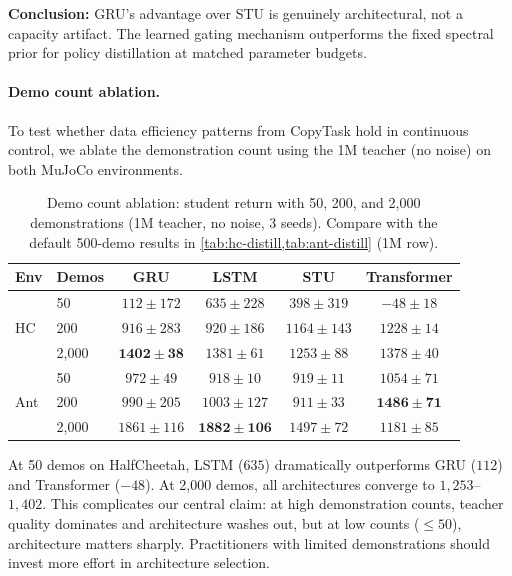 \textbf{Conclusion:} GRU's advantage over STU is genuinely architectural, not a capacity artifact.
The learned gating mechanism outperforms the fixed spectral prior for policy distillation at matched parameter budgets.

\paragraph{Demo count ablation.}
\label{sec:demo-ablation}

To test whether data efficiency patterns from CopyTask hold in continuous control, we ablate the demonstration count using the 1M teacher (no noise) on both MuJoCo environments.

\begin{table}[ht]
\centering
\caption{Demo count ablation: student return with 50, 200, and 2{,}000 demonstrations (1M teacher, no noise, 3 seeds). Compare with the default 500-demo results in \cref{tab:hc-distill,tab:ant-distill} (1M row).}
\label{tab:demo-ablation}
\begin{tabular}{llcccc}
\toprule
Env & Demos & GRU & LSTM & STU & Transformer \\
\midrule
\multirow{3}{*}{HC}
 & 50    & $112 \pm 172$  & $635 \pm 228$  & $398 \pm 319$   & $-48 \pm 18$ \\
 & 200   & $916 \pm 283$  & $920 \pm 186$  & $1164 \pm 143$  & $1228 \pm 14$ \\
 & 2{,}000 & $\mathbf{1402 \pm 38}$  & $1381 \pm 61$  & $1253 \pm 88$  & $1378 \pm 40$ \\
\midrule
\multirow{3}{*}{Ant}
 & 50    & $972 \pm 49$   & $918 \pm 10$   & $919 \pm 11$    & $1054 \pm 71$ \\
 & 200   & $990 \pm 205$  & $1003 \pm 127$ & $911 \pm 33$    & $\mathbf{1486 \pm 71}$ \\
 & 2{,}000 & $1861 \pm 116$ & $\mathbf{1882 \pm 106}$ & $1497 \pm 72$ & $1181 \pm 85$ \\
\bottomrule
\end{tabular}
\end{table}

At 50 demos on HalfCheetah, LSTM ($635$) dramatically outperforms GRU ($112$) and Transformer ($-48$).
At 2{,}000 demos, all architectures converge to $1{,}253$--$1{,}402$.
This complicates our central claim: at high demonstration counts, teacher quality dominates and architecture washes out, but at low counts ($\leq 50$), architecture matters sharply.
Practitioners with limited demonstrations should invest more effort in architecture selection.

